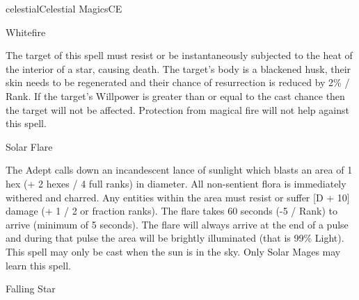 \begin{College}[1.3]{celestial}{Celestial Magics}{CE}
\begin{spell}[S-9]{Whitefire }
\begin{effects}
 The  target  of  this  spell  must  resist  or  be 
instantaneously subjected to the heat of the interior 
of  a  star,  causing  death.  The  target’s  body  is  a 
blackened husk, their skin needs to be regenerated 
and their chance of resurrection is reduced by 2\% / 
Rank.  If  the  target’s  Willpower  is  greater  than  or 
equal to the cast chance then the target will not be 
affected. Protection from magical fire will not help 
against this spell. 
\end{effects}
\end{spell}

\begin{spell}[S-10 solar]{Solar Flare}

\begin{effects}
 The  Adept  calls  down  an  incandescent 
lance of sunlight which blasts an area of 1 hex (+ 2 
hexes  /  4  full  ranks)  in  diameter.  All  non-sentient 
flora  is  immediately  withered  and  charred.  Any 
entities  within  the  area  must  resist  or  suffer  [D  + 
10]  damage  (+  1  /  2  or  fraction  ranks).  The  flare 
takes 60 seconds (-5 / Rank) to arrive (minimum of 
5 seconds). The flare  will always arrive at the end 
of  a  pulse  and  during  that  pulse  the  area  will  be 
brightly illuminated (that is 99\% Light). This spell 
may only be cast when the sun is in the sky. Only 
Solar Mages may learn this spell. 
\end{effects}
\end{spell}

\begin{spell}[S-10 Star]{Falling Star}


\end{spell}
\end{College}
